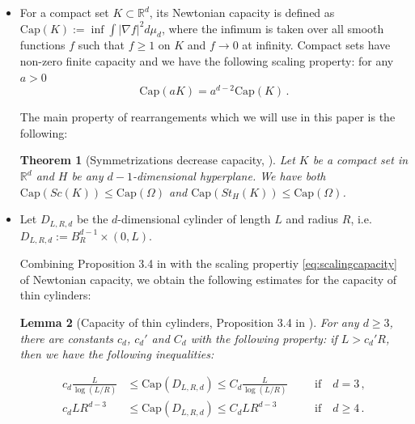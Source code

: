 \documentclass{amsart}
\newtheorem{theorem}{Theorem}[section]
\newtheorem{lemma}[theorem]{Lemma}
\begin{document}
\begin{itemize}
\begin{figure}
\begin{tikzpicture}[scale=0.4]
\end{tikzpicture}

\caption{Example of rearrangements}
\label{picture:rearrangements}
\end{figure}



\subsection{Capacity}
\item For a compact set $K \subset \mathbb R^d$, its Newtonian capacity is defined as
$\text{Cap}(K) := \inf \int |\nabla f|^2 d\mu_d$, where the infimum is taken over all smooth functions $f$ such that $f \geq 1$ on $K$ and $f \to 0$ at infinity. Compact sets have non-zero finite capacity and we have the following scaling property: for any $a>0$
\begin{equation}\label{eq:scalingcapacity}
    \text{Cap}(a K) = a^{d-2} \text{Cap}(K) \, .
\end{equation}


The main property of rearrangements which we will use in this paper is the following:

\begin{theorem}[Symmetrizations decrease capacity, \cite{Sarvas}]\label{theorem:monotonicityrearrangements}
    Let $K$ be a compact set in $\mathbb R^d$ and $H$ be any $d-1$-dimensional hyperplane. We have both $\text{Cap}(Sc(K)) \leq \text{Cap}(\Omega)$ and $\text{Cap}(St_H(K)) \leq \text{Cap}(\Omega)$.
\end{theorem}




    \item Let $ D_{L,R,d}$ be the $d$-dimensional cylinder of length $L$ and radius $R$, i.e. $D_{L,R,d} := B_R^{d-1} \times (0,L)$.


Combining Proposition 3.4 in \cite{port-stone} with the scaling propertiy \eqref{eq:scalingcapacity} of Newtonian capacity, we obtain the following estimates for the capacity of thin cylinders:

\begin{lemma}[Capacity of thin cylinders, Proposition 3.4 in \cite{port-stone}]\label{le:capacityofcylinders}
    For any $d \geq 3$, there are constants $c_d$, $c_d'$  and $C_d$ with the following property: if $L > c_d' R$, then we have the following inequalities:

    \begin{align}
        c_d \frac{L}{\log (L/R)} &\leq \text{Cap}(D_{L,R,d}) \leq C_d \frac{L}{\log (L/R)} &&& \text{if} \quad d=3\, ,\\
        c_d LR^{d-3} &\leq \text{Cap}(D_{L,R,d}) \leq C_d LR^{d-3} &&& \text{if} \quad d \geq 4\, .
    \end{align}
\end{lemma}


\end{itemize}
\end{document}
